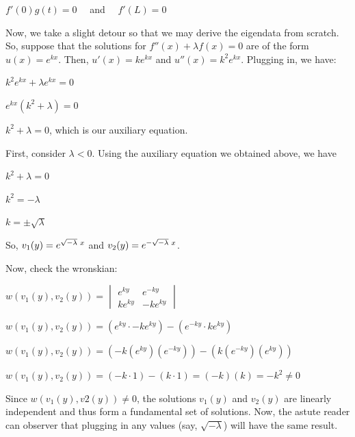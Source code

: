 \documentclass[12pt, executivepaper]{article}
\begin{document}
\begin{flushleft}
\begin{center}
$f'(0)g(t)=0 \quad$ and $\quad f'(L)=0$

\end{center}

Now, we take a slight detour so that we may derive the eigendata from scratch.
So, suppose that the solutions for $f''(x)+\lambda f(x)=0$ are of the form $u(x)=e^{kx}$. Then, $u'(x)=ke^{kx}$ and $u''(x)=k^2e^{kx}$. Plugging in, we have: 

\begin{center}

$k^2e^{kx}+ \lambda e^{kx}=0$

$e^{kx}(k^2+ \lambda)=0$

$k^2+ \lambda=0$, which is our auxiliary equation.

\end{center}

First, consider $\lambda < 0$. Using the auxiliary equation we obtained above, we have \\

\begin{center}

$k^2+ \lambda=0$

$k^2=-\lambda$

$k=\pm \sqrt{\lambda}$

\end{center}

So, $v_{1}(y)=e^{\sqrt{-\lambda} \hspace{1mm} x}$ and $v_{2}(y)=e^{-\sqrt{-\lambda} \hspace{1mm} x}$.

\hspace{3mm}

Now, check the wronskian:

\begin{center}

$w(v_{1}(y), v_{2}(y))=\begin{vmatrix}
e^{ky} & e^{-ky} \\ 
ke^{ky} & -ke^{ky} 
\end{vmatrix}$

$w(v_{1}(y), v_{2}(y))=(e^{ky} \cdot -ke^{ky})-(e^{-ky} \cdot ke^{ky})$

$w(v_{1}(y), v_{2}(y))=(-k(e^{ky})(e^{-ky}))-(k(e^{-ky})(e^{ky}))$

$w(v_{1}(y), v_{2}(y))=(-k \cdot 1)-(k \cdot 1)=(-k)(k)=-k^2 \neq 0$

\end{center}

Since $w(v_{1}(y), v{2}(y)) \neq 0$, the solutions $v_{1}(y)$ and $v_{2}(y)$ are linearly independent and thus form a fundamental set of solutions. Now, the astute reader can observer that plugging in any values (say, $\sqrt{-\lambda}$) will have the same result.


\end{flushleft}
\end{document}
